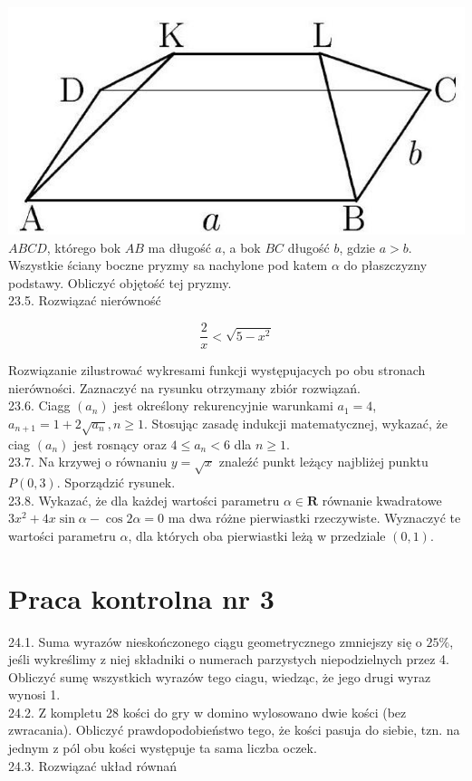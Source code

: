 \documentclass[10pt]{article}
\begin{document}
\includegraphics[max width=\textwidth, center]{2024_11_16_fe5b564401bf7db98894g-031}\\
$A B C D$, którego bok $A B$ ma długość $a$, a bok $B C$ długość $b$, gdzie $a>b$. Wszystkie ściany boczne pryzmy sa nachylone pod katem $\alpha$ do płaszczyzny podstawy. Obliczyć objętość tej pryzmy.\\
23.5. Rozwiązać nierówność

$$
\frac{2}{x}<\sqrt{5-x^{2}}
$$

Rozwiązanie zilustrować wykresami funkcji występujacych po obu stronach nierówności. Zaznaczyć na rysunku otrzymany zbiór rozwiązań.\\
23.6. Ciagg $\left(a_{n}\right)$ jest określony rekurencyjnie warunkami $a_{1}=4$, $a_{n+1}=1+2 \sqrt{a_{n}}, n \geq 1$. Stosując zasadę indukcji matematycznej, wykazać, że ciag $\left(a_{n}\right)$ jest rosnący oraz $4 \leq a_{n}<6$ dla $n \geq 1$.\\
23.7. Na krzywej o równaniu $y=\sqrt{x}$ znaleźć punkt leżący najbliżej punktu $P(0,3)$. Sporządzić rysunek.\\
23.8. Wykazać, że dla każdej wartości parametru $\alpha \in \mathbf{R}$ równanie kwadratowe $3 x^{2}+4 x \sin \alpha-\cos 2 \alpha=0$ ma dwa różne pierwiastki rzeczywiste. Wyznaczyć te wartości parametru $\alpha$, dla których oba pierwiastki leżą w przedziale $(0,1)$.

\section*{Praca kontrolna nr 3}
24.1. Suma wyrazów nieskończonego ciągu geometrycznego zmniejszy się o $25 \%$, jeśli wykreślimy z niej składniki o numerach parzystych niepodzielnych przez 4. Obliczyć sumę wszystkich wyrazów tego ciagu, wiedząc, że jego drugi wyraz wynosi 1.\\
24.2. Z kompletu 28 kości do gry w domino wylosowano dwie kości (bez zwracania). Obliczyć prawdopodobieństwo tego, że kości pasuja do siebie, tzn. na jednym z pól obu kości występuje ta sama liczba oczek.\\
24.3. Rozwiązać układ równań
\end{document}
